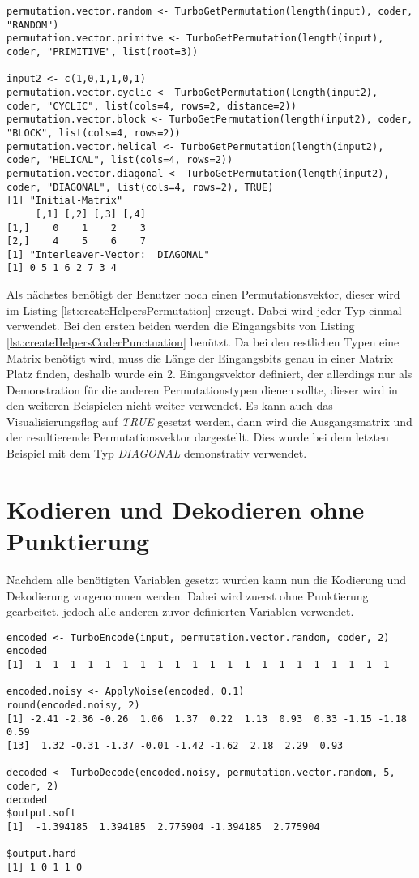 \begin{lstlisting}[caption=Erzeugung von verschiedenen Permutationsvektoren, label={lst:createHelpersPermutation}]
permutation.vector.random <- TurboGetPermutation(length(input), coder, "RANDOM")
permutation.vector.primitve <- TurboGetPermutation(length(input), coder, "PRIMITIVE", list(root=3))

input2 <- c(1,0,1,1,0,1)
permutation.vector.cyclic <- TurboGetPermutation(length(input2), coder, "CYCLIC", list(cols=4, rows=2, distance=2))
permutation.vector.block <- TurboGetPermutation(length(input2), coder, "BLOCK", list(cols=4, rows=2))
permutation.vector.helical <- TurboGetPermutation(length(input2), coder, "HELICAL", list(cols=4, rows=2))
permutation.vector.diagonal <- TurboGetPermutation(length(input2), coder, "DIAGONAL", list(cols=4, rows=2), TRUE)
[1] "Initial-Matrix"
     [,1] [,2] [,3] [,4]
[1,]    0    1    2    3
[2,]    4    5    6    7
[1] "Interleaver-Vector:  DIAGONAL"
[1] 0 5 1 6 2 7 3 4
\end{lstlisting}

Als nächstes benötigt der Benutzer noch einen Permutationsvektor, dieser wird im Listing \ref{lst:createHelpersPermutation} erzeugt. Dabei wird jeder Typ einmal verwendet. Bei den ersten beiden werden die Eingangsbits von Listing \ref{lst:createHelpersCoderPunctuation} benützt. Da bei den restlichen Typen eine Matrix benötigt wird, muss die Länge der Eingangsbits genau in einer Matrix Platz finden, deshalb wurde ein 2. Eingangsvektor definiert, der allerdings nur als Demonstration für die anderen Permutationstypen dienen sollte, dieser wird in den weiteren Beispielen nicht weiter verwendet. Es kann auch das Visualisierungsflag auf \emph{TRUE} gesetzt werden, dann wird die Ausgangsmatrix und der resultierende Permutationsvektor dargestellt. Dies wurde bei dem letzten Beispiel mit dem Typ \emph{DIAGONAL} demonstrativ verwendet.

\section{Kodieren und Dekodieren ohne Punktierung}
\label{sec:example_withoutPunctuation}
Nachdem alle benötigten Variablen gesetzt wurden kann nun die Kodierung und Dekodierung vorgenommen werden. Dabei wird zuerst ohne Punktierung gearbeitet, jedoch alle anderen zuvor definierten Variablen verwendet.

\begin{lstlisting}[caption=Kodierung und Dekodierung ohne Punktierung, label={lst:encodeDecodeWithoutPunctuation}]
encoded <- TurboEncode(input, permutation.vector.random, coder, 2)
encoded
[1] -1 -1 -1  1  1  1 -1  1  1 -1 -1  1  1 -1 -1  1 -1 -1  1  1  1

encoded.noisy <- ApplyNoise(encoded, 0.1)
round(encoded.noisy, 2)
[1] -2.41 -2.36 -0.26  1.06  1.37  0.22  1.13  0.93  0.33 -1.15 -1.18  0.59
[13]  1.32 -0.31 -1.37 -0.01 -1.42 -1.62  2.18  2.29  0.93

decoded <- TurboDecode(encoded.noisy, permutation.vector.random, 5, coder, 2)
decoded
$output.soft
[1]  -1.394185  1.394185  2.775904 -1.394185  2.775904

$output.hard
[1] 1 0 1 1 0
\end{lstlisting}

